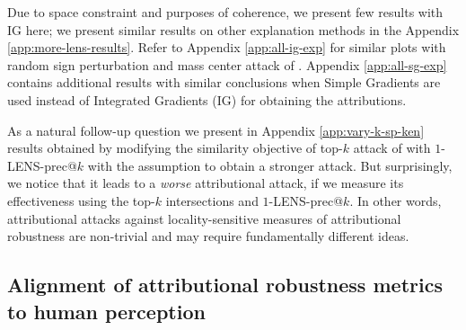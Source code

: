 \documentclass[letterpaper]{article} %
\begin{document}

Due to space constraint and purposes of coherence, we present few results with IG here; we present similar results on other explanation methods in the Appendix \ref{app:more-lens-results}. Refer to Appendix \ref{app:all-ig-exp} for similar plots with random sign perturbation and mass center attack of \citet{ghorbani2018interpretation}. Appendix \ref{app:all-sg-exp} contains additional results with similar conclusions when Simple Gradients are used instead of Integrated Gradients (IG) for obtaining the attributions. 

As a natural follow-up question we present in Appendix \ref{app:vary-k-sp-ken} results obtained by modifying the similarity objective of top-$k$ attack of \citet{ghorbani2018interpretation} with $1$-LENS-prec@$k$ with the assumption to obtain a stronger attack. But surprisingly, we notice that it leads to a \emph{worse} attributional attack, if we measure its effectiveness using the top-$k$ intersections and $1$-LENS-prec@$k$. In other words, attributional attacks against locality-sensitive measures of attributional robustness are non-trivial and may require fundamentally different ideas.

\subsection{Alignment of attributional robustness metrics to human perception}
\label{subsec:survey-human}
\end{document}
